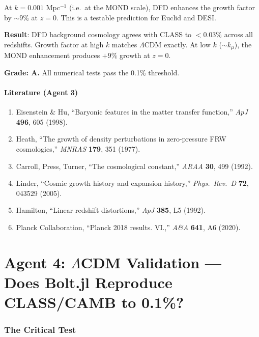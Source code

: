 \documentclass[11pt,a4paper]{article}
\begin{document}
At $k = 0.001$ Mpc$^{-1}$ (i.e.\ at the MOND scale), DFD enhances the growth factor by $\sim 9\%$ at $z = 0$. This is a testable prediction for Euclid and DESI.

\begin{tcolorbox}[colback=green!5!white, colframe=green!60!black, title={Agent 3: Background Validation --- ALL PASS}]
\textbf{Result}: DFD background cosmology agrees with CLASS to $< 0.03\%$ across all redshifts. Growth factor at high $k$ matches $\Lambda$CDM exactly. At low $k$ ($\sim k_\mu$), the MOND enhancement produces $+9\%$ growth at $z = 0$.

\textbf{Grade: A.} All numerical tests pass the 0.1\% threshold.
\end{tcolorbox}

\subsection{Literature (Agent 3)}

\begin{enumerate}
\item Eisenstein \& Hu, ``Baryonic features in the matter transfer function,'' \textit{ApJ} \textbf{496}, 605 (1998).
\item Heath, ``The growth of density perturbations in zero-pressure FRW cosmologies,'' \textit{MNRAS} \textbf{179}, 351 (1977).
\item Carroll, Press, Turner, ``The cosmological constant,'' \textit{ARAA} \textbf{30}, 499 (1992).
\item Linder, ``Cosmic growth history and expansion history,'' \textit{Phys.\ Rev.\ D} \textbf{72}, 043529 (2005).
\item Hamilton, ``Linear redshift distortions,'' \textit{ApJ} \textbf{385}, L5 (1992).
\item Planck Collaboration, ``Planck 2018 results. VI.,'' \textit{A\&A} \textbf{641}, A6 (2020).
\end{enumerate}


\part{Agent 4: $\Lambda$CDM Validation --- Does Bolt.jl Reproduce CLASS/CAMB to 0.1\%?}
\label{part:lcdm-validation}

\section{The Critical Test}
\end{document}
